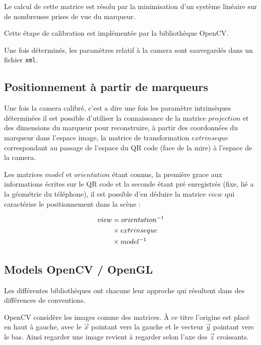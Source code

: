 \documentclass[10pt,a4paper,twoside, twocolumn]{report}
\begin{document}
Le calcul de cette matrice est résolu par la minimisation d'un système linéaire sur de nombreuses prises de vue du marqueur. 

Cette étape de calibration est implémentée par la bibliothèque OpenCV.

Une fois déterminés, les paramètres relatif à la camera sont sauvegardés dans un fichier \texttt{xml}.

\subsection{Positionnement à partir de marqueurs}\label{section:positionnement}

Une fois la camera calibré, c'est a dire une fois les paramètre intrinsèques déterminées il est possible d'utiliser la connaissance de la matrice $projection$ et des dimensions du marqueur pour reconstruire, à partir des coordonnées du marqueur dans l'espace image, la matrice de transformation $extrinseque$ correspondant au passage de l'espace du QR code (face de la mire) à l'espace de la camera.

Les matrices $model$ et $orientation$ étant connus, la première grace aux informations écrites sur le QR code et la seconde étant pré enregistrés (fixe, lié a la géométrie du téléphone), il est possible d'en déduire la matrice $view$ qui caractérise le positionnement dans la scène :

\begin{align}
	view	&=			orientation^{-1}	\notag \\
				&\times extrinseque				\notag \\
				&\times model^{-1}
\end{align}

\subsection{Models OpenCV / OpenGL}

Les différentes bibliothèques ont chacune leur approche qui résultent dans des différences de conventions.

OpenCV considère les images comme des matrices. À ce titre l'origine est placé en haut à gauche, avec le $\vec x$ pointant vers la gauche et le vecteur $\vec y$ pointant vers le bas. Ainsi regarder une image revient à regarder selon l'axe des $\vec z$ croissants.
\end{document}
